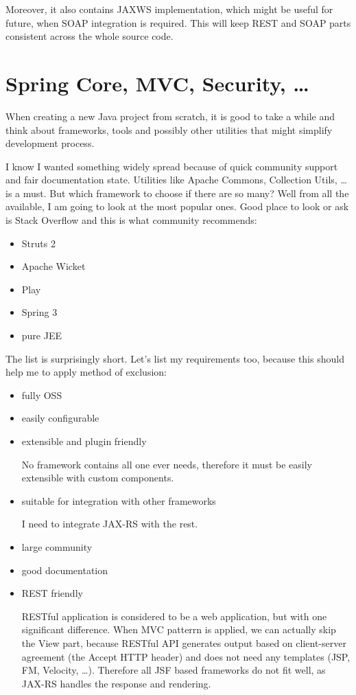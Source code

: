 	Moreover, it also contains \gls{JAXWS} implementation, which might be useful for future, when SOAP integration is
	required. This will keep REST and SOAP parts consistent across the whole source code.
	
	\section{Spring Core, MVC, Security, \ldots}
	
	When creating a new Java project from scratch, it is good to take a while and think about frameworks, tools and
	possibly other utilities that might simplify development process.
	
	I know I wanted something widely spread because of quick community support and fair documentation state. Utilities like
	Apache Commons, Collection Utils, \ldots is a must. But which framework to choose if there are so many? Well from all
	the available, I am going to look at the most popular ones. Good place to look or ask is Stack Overflow and this is
	what community recommends:
	
	\begin{itemize}
		\item Struts 2
		\item Apache Wicket
		\item Play
		\item Spring 3
		\item pure JEE
	\end{itemize}
	
	The list is surprisingly short. Let's list my requirements too, because this should help me to apply method of
	exclusion:
	
	\begin{itemize}
		\item fully \gls{OSS}
		\item easily configurable
		\item extensible and plugin friendly
		
		No framework contains all one ever needs, therefore it must be easily extensible with custom components.
		\item suitable for integration with other frameworks
		
		I need to integrate JAX-RS with the rest.
		\item large community
		\item good documentation
		\item REST friendly
		
		RESTful application is considered to be a web application, but with one significant difference. When MVC patterrn is
		applied, we can actually skip the View part, because RESTful API generates output based on client-server agreement
		(the Accept HTTP header) and does not need any templates (JSP, FM, Velocity, \ldots). Therefore all JSF based frameworks
		do not fit well, as JAX-RS handles the response and rendering.
	\end{itemize}
	
